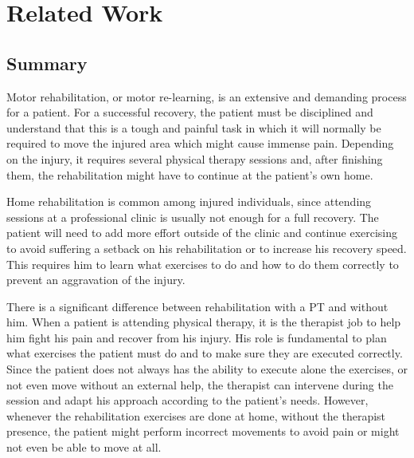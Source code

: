 \chapter{Related Work}
\label{section-related}

\section*{Summary}

Motor rehabilitation, or motor re-learning, is an extensive and demanding process for a patient.
For a successful recovery, the patient must be disciplined and understand that this is a tough and painful task in which it
will normally be required to move the injured area which might cause immense pain\cite{Singh2014a}.
Depending on the injury, it requires several physical therapy sessions and, after finishing them, 
the rehabilitation might have to continue at the patient's own home\cite{Lohse2013}.

Home rehabilitation is common among injured individuals, since
attending sessions at a professional clinic is usually not enough for a full recovery.
The patient will need to add more effort outside of the clinic and continue 
exercising to avoid suffering a setback on his rehabilitation \cite{Borghese2013} 
or to increase his recovery speed. 
This requires him to learn what exercises to do and how to do 
them correctly to prevent an aggravation of the injury\cite{Tang2014a}.

There is a significant difference between rehabilitation with a \ac{PT} and without him.
When a patient is attending physical therapy, it is the therapist 
job to help him fight his pain and recover from his injury.
His role is fundamental to plan what exercises the patient must do and to make sure they are executed correctly. 
Since the patient does not always has the ability to execute alone the exercises, or not even move without an external help,
the therapist can intervene during the session and adapt his approach according to the patient's needs\cite{Sigrist2013}.
However, whenever the rehabilitation exercises are done at home, without the therapist presence, the patient might 
perform incorrect movements to avoid pain\cite{Tang2014a} or might not even be able to move at all.


